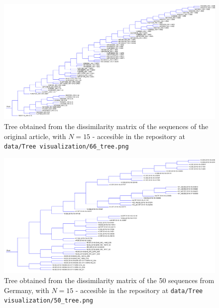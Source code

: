 \documentclass[english,13pt,a4paper]{article}
\theoremstyle{definition}
\theoremstyle{remark}
\theoremstyle{defstyle}
\begin{document}
\begin{figure}[H]
    \centering
    \includegraphics[width=.95\textheight, angle=90]{../data/Tree visualization/66_tree.png}
    \caption{Tree obtained from the dissimilarity matrix of the sequences of the original article, with $N = 15$ - accesible in the repository at \texttt{data/Tree  visualization/66\_tree.png}}
    \label{fig:tree66}
\end{figure}

\begin{figure}[H]
    \centering
    \includegraphics[width=.95\textheight, angle=90]{../data/Tree visualization/50_tree.png}
    \caption{Tree obtained from the dissimilarity matrix of the 50 sequences from Germany, with $N = 15$ - accesible in the repository at \texttt{data/Tree  visualization/50\_tree.png}}
    \label{fig:tree50}
\end{figure}
\end{document}
